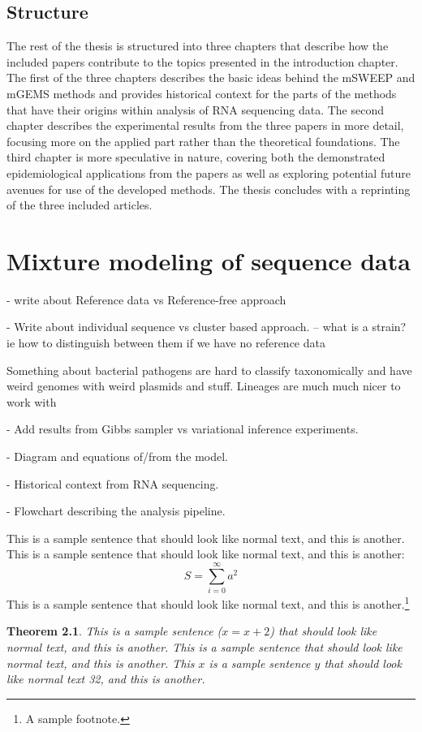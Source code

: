 \documentclass[officiallayout]{tktla}
\newtheorem{theorem}{Theorem}[chapter]
\begin{document}
\section{Structure}

The rest of the thesis is structured into three chapters that describe
how the included papers contribute to the topics presented in the
introduction chapter. The first of the three chapters describes the
basic ideas behind the mSWEEP and mGEMS methods and provides
historical context for the parts of the methods that have their
origins within analysis of RNA sequencing data. The second chapter
describes the experimental results from the three papers in more
detail, focusing more on the applied part rather than the theoretical
foundations. The third chapter is more speculative in nature, covering
both the demonstrated epidemiological applications from the papers as
well as exploring potential future avenues for use of the developed
methods. The thesis concludes with a reprinting of the three included
articles.

\chapter{Mixture modeling of sequence data}

- write about Reference data vs Reference-free approach

- Write about individual sequence vs cluster based approach.
-- what is a strain? ie how to distinguish between them if we have no reference data

Something about bacterial pathogens are hard to classify taxonomically
and have weird genomes with weird plasmids and stuff.  Lineages are
much much nicer to work with

- Add results from Gibbs sampler vs variational inference experiments.

- Diagram and equations of/from the model.

- Historical context from RNA sequencing.

- Flowchart describing the analysis pipeline.

This is a sample sentence that should look like normal text, and this
is another. This is a sample sentence that should look like normal
text, and this is another:
\[ S = \sum_{i=0}^{\infty} a^2 \]
This is a sample sentence that should look like normal text, and this
is another.\footnote{A sample footnote.}

\begin{theorem}
This is a sample sentence ($x=x+2$) that should look like normal text,
and this is another. This is a sample sentence that should look like
normal text, and this is another. This $x$ is a sample sentence $y$
that should look like normal text 32, and this is another.
\end{theorem}
\end{document}
